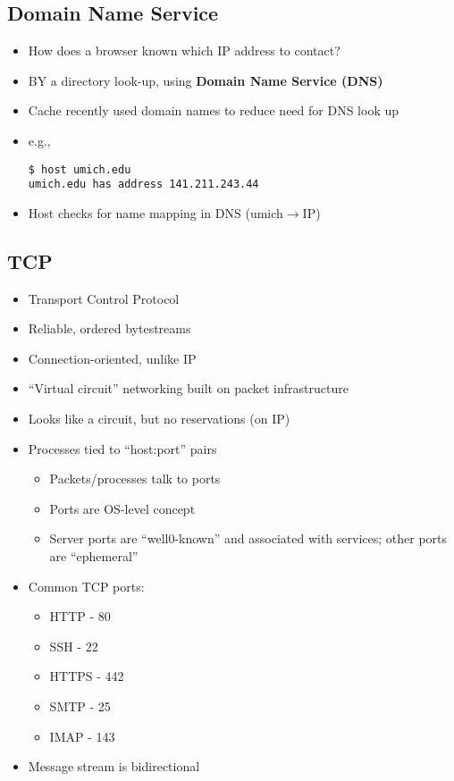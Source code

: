 \subsection{Domain Name Service}
\begin{itemize}
	\item How does a browser known which IP address to contact?
	\item BY a directory look-up, using \textbf{Domain Name Service (DNS)}
	\item Cache recently used domain names to reduce need for DNS look up
	\item e.g.,
	\begin{lstlisting}[style=bash]
$ host umich.edu
umich.edu has address 141.211.243.44
	\end{lstlisting}
	\item Host checks for name mapping in DNS (umich$\to$IP)
\end{itemize}

\subsection{TCP}
\begin{itemize}
	\item Transport Control Protocol
	\item Reliable, ordered bytestreams
	\item Connection-oriented, unlike IP
	\item ``Virtual circuit'' networking built on packet infrastructure
	\item Looks like a circuit, but no reservations (on IP)
	\item Processes tied to ``host:port'' pairs
	\begin{itemize}
		\item Packets/processes talk to ports
		\item Ports are OS-level concept
		\item Server ports are ``well0-known'' and associated with services; other ports are ``ephemeral''
	\end{itemize}
	\item Common TCP ports:
	\begin{itemize}
		\item HTTP - 80
		\item SSH - 22
		\item HTTPS - 442
		\item SMTP - 25
		\item IMAP - 143
	\end{itemize}
	\item Message stream is bidirectional
\end{itemize}

